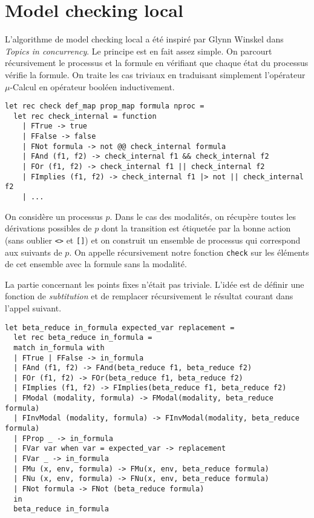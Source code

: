 \documentclass[a4paper]{article}
\begin{document}
\section{Model checking local}

L'algorithme de model checking local a été inspiré par Glynn Winskel
dans \emph{Topics in concurrency}. Le principe est en fait assez
simple. On parcourt récursivement le processus et la formule en
vérifiant que chaque état du processus vérifie la formule. On traite
les cas triviaux en traduisant simplement l'opérateur $\mu$-Calcul en
opérateur booléen inductivement.

\begin{lstlisting}[language=caml]
let rec check def_map prop_map formula nproc =
  let rec check_internal = function
    | FTrue -> true
    | FFalse -> false
    | FNot formula -> not @@ check_internal formula
    | FAnd (f1, f2) -> check_internal f1 && check_internal f2
    | FOr (f1, f2) -> check_internal f1 || check_internal f2
    | FImplies (f1, f2) -> check_internal f1 |> not || check_internal f2
    | ...
\end{lstlisting}

On considère un processus $p$. Dans le cas des modalités, on récupère
toutes les dérivations possibles de $p$ dont la transition est
étiquetée par la bonne action (sans oublier \texttt{<>}
et \texttt{[]}) et on construit un ensemble de processus qui
correspond aux suivants de $p$. On appelle récursivement notre
fonction \texttt{check} sur les éléments de cet ensemble avec la
formule sans la modalité.

La partie concernant les points fixes n'était pas triviale. L'idée est
de définir une fonction de \emph{subtitution} et de remplacer
récursivement le résultat courant dans l'appel suivant.

\begin{lstlisting}[language=caml]
let beta_reduce in_formula expected_var replacement =
  let rec beta_reduce in_formula =
  match in_formula with
  | FTrue | FFalse -> in_formula
  | FAnd (f1, f2) -> FAnd(beta_reduce f1, beta_reduce f2)
  | FOr (f1, f2) -> FOr(beta_reduce f1, beta_reduce f2)
  | FImplies (f1, f2) -> FImplies(beta_reduce f1, beta_reduce f2)
  | FModal (modality, formula) -> FModal(modality, beta_reduce formula)
  | FInvModal (modality, formula) -> FInvModal(modality, beta_reduce formula)
  | FProp _ -> in_formula
  | FVar var when var = expected_var -> replacement
  | FVar _ -> in_formula
  | FMu (x, env, formula) -> FMu(x, env, beta_reduce formula)
  | FNu (x, env, formula) -> FNu(x, env, beta_reduce formula)
  | FNot formula -> FNot (beta_reduce formula)
  in
  beta_reduce in_formula
\end{lstlisting}
\end{document}
